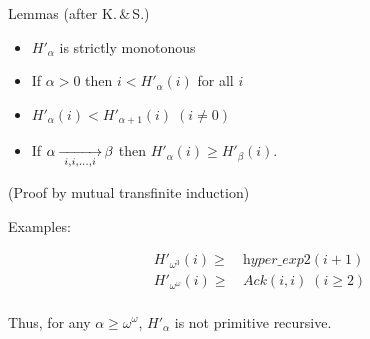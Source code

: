 \documentclass[10pt, fleqn]{beamer}
\begin{document}
 



\begin{frame}[fragile, label={fgflemmas}]

\begin{block}{Lemmas (after K.\,\&\,S.)}
   \begin{itemize} 
    \item \textcolor{mathcolor}{$H'_\alpha$} is strictly monotonous
    
     \item  If \textcolor{mathcolor}{$\alpha>0$} then \textcolor{mathcolor}{$ i < H'_\alpha(i)$} for all $i$
    
    \item   \textcolor{mathcolor}{$H'_\alpha(i) < H'_{\alpha+1}(i) \; (i \not=0)$}
    
       \item     If \textcolor{mathcolor}{$\alpha \rplus{i,i,\dots,i} \beta$} then \textcolor{mathcolor}{$H'_\alpha(i)\geq H'_\beta(i)$}.
         

       \end{itemize}
       (Proof by mutual transfinite induction)
 \end{block}  

 \begin{block}{Examples:}
         
      {\color{mathcolor}
      
        \begin{align*}
      H'_{\omega^3}(i) \geq\, & \textit{hyper\_exp2}(i+1) \\
      H'_{\omega^\omega}(i)\geq\,& \textit{Ack}(i,i)\; (i\geq 2)\\
    \end{align*}
  }%
 Thus, for any \textcolor{mathcolor}{$\alpha\geq\omega^\omega$}, \textcolor{mathcolor}{$H'_\alpha$} is not primitive recursive.
  \end{block}
  
    
\end{frame}
 




    
\end{document}
